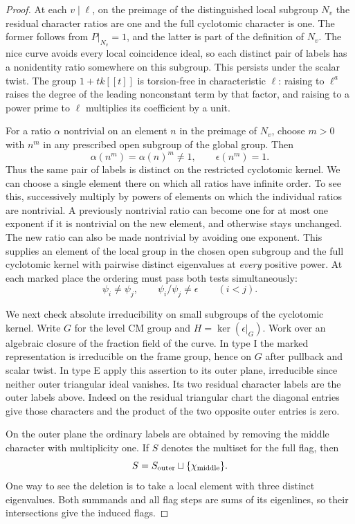 \begin{proof}
At each \(v\mid\ell\), on the preimage of the distinguished local
subgroup \(N_v\) the residual character ratios are one and the full
cyclotomic character is one. The former follows from \(P|_{N_v}=1\),
and the latter is part of the definition of \(N_v\).
The nice curve avoids every local coincidence ideal, so each
distinct pair of labels has a nonidentity ratio somewhere on this
subgroup. This persists under the scalar twist. The group
\(1+t k[[t]]\) is torsion-free in characteristic \(\ell\):
raising to \(\ell^a\) raises the degree of the leading nonconstant
term by that factor, and raising to a power prime to \(\ell\)
multiplies its coefficient by a unit.

For a ratio \(\alpha\) nontrivial on an element \(n\) in
the preimage of \(N_v\), choose \(m>0\) with \(n^m\) in any
prescribed open subgroup of the global group. Then
\[
    \alpha(n^m)=\alpha(n)^m\ne1,\qquad
    \epsilon(n^m)=1 .
\]
Thus the same pair of labels is distinct on the restricted
cyclotomic kernel. We can choose a single element there on which
all ratios have infinite order. To see this, successively multiply by
powers of elements on which the individual ratios are nontrivial. A previously nontrivial
ratio can become one for at most one exponent if it is nontrivial
on the new element, and otherwise stays unchanged. The new ratio
can also be made nontrivial by avoiding one exponent. This supplies
an element of the local group in the chosen open subgroup and the
full cyclotomic kernel with pairwise distinct eigenvalues at
\emph{every} positive power. At each marked place the ordering must pass both tests simultaneously:
\[
 \psi_i\ne\psi_j,\qquad \psi_i/\psi_j\ne\epsilon\qquad(i<j).
\]

We next check absolute irreducibility on small subgroups of the
cyclotomic kernel. Write \(G\) for the level CM group and
\(H=\ker(\epsilon|_G)\). Work over an algebraic closure of the
fraction field of the curve. In type I the marked representation is
irreducible on the frame group, hence on \(G\) after pullback and
scalar twist. In type E apply this assertion to its outer plane,
irreducible since neither outer triangular ideal vanishes. Its two
residual character labels are the outer labels above. Indeed on the
residual triangular chart the diagonal entries give those characters
and the product of the two opposite outer entries is zero.

On the outer plane the ordinary labels are obtained by removing the middle character with multiplicity one. If \(S\) denotes the multiset for the full flag, then
\[
 S=S_{\rm outer}\sqcup\{\chi_{\rm middle}\}.
\] One way to see the deletion
is to take a local element with three distinct eigenvalues. Both
summands and all flag steps are sums of its eigenlines, so their
intersections give the induced flags.


\end{proof}

